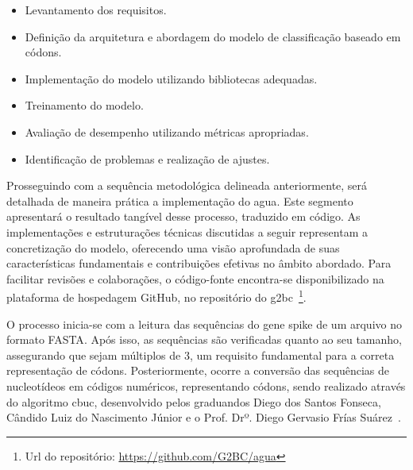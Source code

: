 \begin{itemize}
  \item Levantamento dos requisitos.
  \item Definição da arquitetura e abordagem do modelo de classificação baseado em códons.
  \item Implementação do modelo utilizando bibliotecas adequadas.
  \item Treinamento do modelo.
  \item Avaliação de desempenho utilizando métricas apropriadas.
  \item Identificação de problemas e realização de ajustes.
\end{itemize}

Prosseguindo com a sequência metodológica delineada anteriormente, será detalhada de maneira prática a implementação do \gls{agua}. Este segmento apresentará o resultado tangível desse processo, traduzido em código. As implementações e estruturações técnicas discutidas a seguir representam a concretização do modelo, oferecendo uma visão aprofundada de suas características fundamentais e contribuições efetivas no âmbito abordado. Para facilitar revisões e colaborações, o código-fonte encontra-se disponibilizado na plataforma de hospedagem GitHub, no repositório do \gls{g2bc}~\footnote{Url do repositório: \url{https://github.com/G2BC/agua}}.

O processo inicia-se com a leitura das sequências do gene spike de um arquivo no formato {FASTA}. Após isso, as sequências são verificadas quanto ao seu tamanho, assegurando que sejam múltiplos de 3, um requisito fundamental para a correta representação de códons. Posteriormente, ocorre a conversão das sequências de nucleotídeos em códigos numéricos, representando códons, sendo realizado através do algoritmo \gls{cbuc}, desenvolvido pelos graduandos Diego dos Santos Fonseca, Cândido Luiz do Nascimento Júnior e o {Prof.} Drº. Diego Gervasio Frías Suárez~\cite{identificacao_cbuc_diego_2021,spike_cbuc_candido_2021}.

